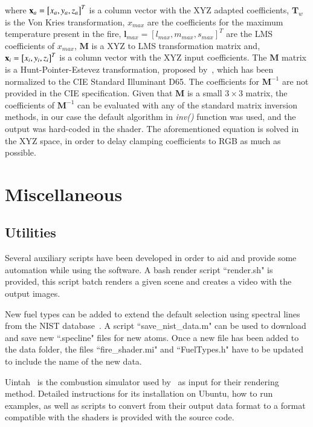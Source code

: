 where $\mathbf{x}_a = \left[ x_a, y_a, z_a \right]^{T}$ is a column vector with the XYZ adapted coefficients, $\mathbf{T}_w$ is the Von Kries transformation, $x_{max}$ are the coefficients for the maximum temperature present in the fire,  $\mathbf{l}_{max} = \left[ l_{max}, m_{max}, s_{max} \right]^{T}$ are the LMS coefficients of $x_{max}$, $\mathbf{M}$ is a XYZ to LMS transformation matrix and, $\mathbf{x}_i = \left[ x_i, y_i, z_i \right]^{T}$ is a column vector with the XYZ input coefficients.
The $\mathbf{M}$ matrix is a Hunt-Pointer-Estevez transformation, proposed by~\cite{Hunt:1985}, which has been normalized to the CIE Standard Illuminant D65.
The coefficients for $\mathbf{M}^{-1}$ are not provided in the CIE specification.
Given that $\mathbf{M}$ is a small $3 \times 3$ matrix, the coefficients of $\mathbf{M}^{-1}$ can be evaluated with any of the standard matrix inversion methods, in our case the default algorithm in \Matlab \textit{inv()} function was used, and the output was hard-coded in the shader.
The aforementioned equation is solved in the XYZ space, in order to delay clamping coefficients to RGB as much as possible.

\section{Miscellaneous}
\label{sec:miscellaneous}

\subsection{Utilities}
\label{sec:utilities}

Several auxiliary scripts have been developed in order to aid and provide some automation while using the software.
A bash render script ``render.sh" is provided, this script batch renders a given \Maya scene and creates a video with the output images.

New fuel types can be added to extend the default selection using spectral lines from the NIST database~\cite{Nist}.
A \Matlab script ``save\_nist\_data.m" can be used to download and save new ``.specline" files for new atoms.
Once a new file has been added to the data folder, the files ``fire\_shader.mi" and ``FuelTypes.h" have to be updated to include the name of the new data.

Uintah~\cite{Uintah} is the combustion simulator used by~\cite{Pegoraro:2006} as input for their rendering method.
Detailed instructions for its installation on Ubuntu, how to run examples, as well as scripts to convert from their output data format to a format compatible with the shaders is provided with the source code.

